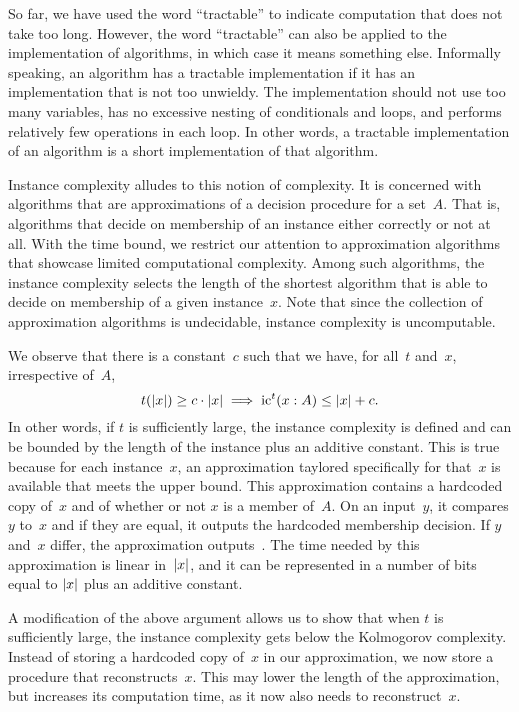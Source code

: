 \begin{example}
\label{ex:ic}%
  So far, we have used the word \enquote{tractable} to indicate computation that does not take too long.
  However, the word \enquote{tractable} can also be applied to the implementation of algorithms, in which case it means something else.
  Informally speaking, an algorithm has a tractable implementation if it has an implementation that is not too unwieldy.
  The implementation should not use too many variables, has no excessive nesting of conditionals and loops, and performs relatively few operations in each loop.
  In other words, a tractable implementation of an algorithm is a short implementation of that algorithm.

  Instance complexity alludes to this notion of complexity.
  It is concerned with algorithms that are approximations of a decision procedure for a set~$A$.
  That is, algorithms that decide on membership of an instance either correctly or not at all.
  With the time bound, we restrict our attention to approximation algorithms that showcase limited computational complexity.
  Among such algorithms, the instance complexity selects the length of the shortest algorithm that is able to decide on membership of a given instance~$x$.
  Note that since the collection of approximation algorithms is undecidable, instance complexity is uncomputable.

  We observe that there is a constant~$c$ such that we have, for all~$t$ and~$x$, irrespective of~$A$,
  \begin{equation*}
    t({\lvert x\rvert}) \ge c \cdot {\lvert x\rvert} \implies \operatorname{ic}^t(x : A) \le {\lvert x\rvert} + c.
  \end{equation*}
  In other words, if $t$ is sufficiently large, the instance complexity is defined and can be bounded by the length of the instance plus an additive constant.
  This is true because for each instance~$x$, an approximation taylored specifically for that~$x$ is available that meets the upper bound.
  This approximation contains a hardcoded copy of~$x$ and of whether or not $x$ is a member of~$A$.
  On an input~$y$, it compares $y$ to~$x$ and if they are equal, it outputs the hardcoded membership decision.
  If $y$ and~$x$ differ, the approximation outputs~.
  The time needed by this approximation is linear in~${\lvert x\rvert}$, and it can be represented in a number of bits equal to ${\lvert x\rvert}$ plus an additive constant.

  A modification of the above argument allows us to show that when $t$ is sufficiently large, the instance complexity gets below the Kolmogorov complexity.
  Instead of storing a hardcoded copy of~$x$ in our approximation, we now store a procedure that reconstructs~$x$.
  This may lower the length of the approximation, but increases its computation time, as it now also needs to reconstruct~$x$.
\end{example}

